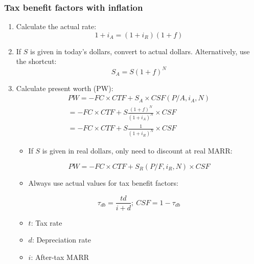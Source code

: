 \subsubsection{Tax benefit factors with inflation}
    \begin{process}
        \begin{enumerate}
            \item Calculate the actual rate:
            \begin{equation}
                1 + i_A = (1 + i_R)(1 + f)
            \end{equation}
            
            \item If \( S \) is given in today's dollars, convert to actual dollars. Alternatively, use the shortcut:
            \begin{equation}
                S_A = S(1 + f)^N
            \end{equation}
            
            \item Calculate present worth (PW):
            \begin{align}
                PW = -FC \times CTF + S_A \times CSF \left(P/A,i_A,N \right) \\ 
                = -FC \times CTF + S \frac{(1 + f)^N}{(1 + i_A)^N} \times CSF \\ 
                = -FC \times CTF + S \frac{1}{(1 + i_R)^N} \times CSF
            \end{align}
            \begin{itemize}
                \item If \( S \) is given in real dollars, only need to discount at real MARR:
            \end{itemize} 
            \begin{equation}
                PW = -FC \times CTF + S_R (P/F, i_R, N) \times CSF
            \end{equation}
        
            \begin{itemize}
                \item Always use actual values for tax benefit factors:
            \end{itemize}
            \begin{equation}
                \tau_{db} = \frac{td}{i + d};\: CSF = 1-\tau_{db}
            \end{equation}
            \begin{itemize}
                \item $t$: Tax rate
                \item $d$: Depreciation rate
                \item $i$: After-tax MARR
            \end{itemize}


\end{enumerate}
\end{process}
